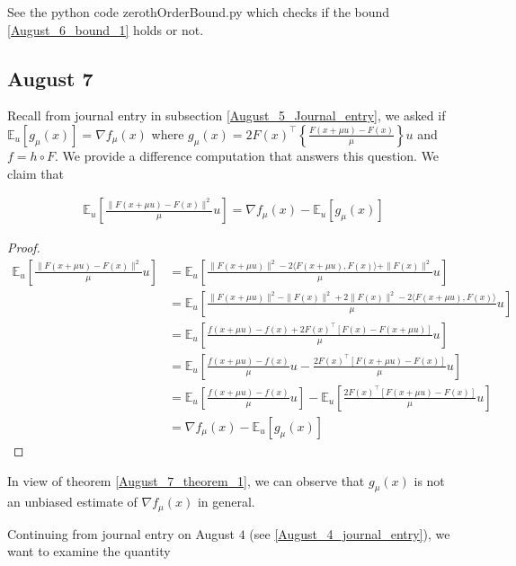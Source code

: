 \documentclass{article}
\begin{document}
See the python code zerothOrderBound.py which checks if the bound \eqref{August_6_bound_1} holds or not.

\subsection{August 7}

Recall from journal entry in subsection \ref{August_5_Journal_entry}, we asked if $\mathbb{E}_u[g_{\mu}(x)] = \nabla f_{\mu}(x)$ where $g_{\mu}(x) = 2F(x)^\top\left\{\frac{F(x+\mu u)-F(x)}{\mu}\right\}u$ and $f = h \circ F$. We provide a difference computation that answers this question. We claim that

\begin{theorem} \label{August_7_theorem_1}


\begin{align}
\mathbb{E}_u\left[\frac{\|F(x+\mu u)-F(x)\|^2}{\mu}u\right] = \nabla f_{\mu}(x) - \mathbb{E}_u[g_{\mu}(x)]
\end{align}

\begin{proof}
\begin{align*}
\mathbb{E}_u\left[\frac{\|F(x+\mu u) - F(x)\|^2}{\mu}u\right] & = \mathbb{E}_u\left[\frac{\|F(x+\mu u)\|^2 - 2\langle F(x+\mu u), F(x)\rangle + \|F(x)\|^2 }{\mu}u\right] \\ & = \mathbb{E}_u\left[\frac{\|F(x+\mu u)\|^2 - \|F(x)\|^2 + 2\|F(x)\|^2 - 2\langle F(x+\mu u), F(x)\rangle }{\mu}u\right] \\ & = \mathbb{E}_u\left[\frac{f(x+\mu u)-f(x) + 2F(x)^\top[F(x)-F(x+\mu u)]}{\mu}u\right] \\ & = \mathbb{E}_u\left[\frac{f(x+\mu u)-f(x)}{\mu}u - \frac{2F(x)^\top[F(x+\mu u)-F(x)]}{\mu}u\right] \\ & = \mathbb{E}_u\left[\frac{f(x+\mu u)-f(x)}{\mu}u\right] - \mathbb{E}_u\left[ \frac{2F(x)^\top[F(x+\mu u)-F(x)]}{\mu}u\right] \\ & = \nabla f_{\mu}(x) - \mathbb{E}_u[g_{\mu}(x)]
\end{align*}
\end{proof}

\end{theorem}

In view of theorem \ref{August_7_theorem_1}, we can observe that $g_{\mu}(x)$ is not an unbiased estimate of $\nabla f_{\mu}(x)$ in general. \newline 

Continuing from journal entry on August $4$ (see \ref{August_4_journal_entry}), we want to examine the quantity 
\end{document}

